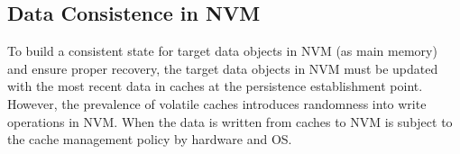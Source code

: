 \begin{comment}
In this usage model, NVM communicates directly with CPUs.
OS regards NVM as regular memory, similar to DRAM. %
NVM provides byte address-ability to OS and its applications.
NVM is accessed through {\fontfamily{qcr}\selectfont
load} and {\fontfamily{qcr}\selectfont store} instructions.

In the second model, NVM connects to the host
by the I/O controller and I/O bus (e.g., PCI-E)~\cite{}.  %
NVM is exposed as a block device in OS. 
NVM is accessed via block I/O interface. 
A NVM driver may be added into OS to convert I/O requests to memory requests.
There might be a file system.

Block Mode programming model provides the traditional block read/write interface to kernel modules such as file systems and, in some cases, to applications wanting to use the block device directly (for example, by opening /dev/sda1 on a Linux system).



\end{comment}

\subsection{Data Consistence in NVM}
To build a consistent state for target data objects in NVM (as main memory) and ensure proper recovery, 
the target data objects in NVM must be updated with the most
recent data in caches at the persistence establishment point.
However, the prevalence of %
volatile caches introduces randomness into write operations in NVM.
When the data is written from caches to NVM is subject to
the cache management policy by hardware and OS.

